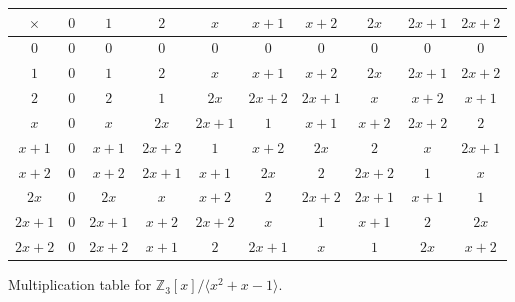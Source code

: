 \begin{solution}
    \begin{figure}[H]
      \centering
      \begin{tabular}{c|ccccccccc}
        $\times$ & $0$ & $1$ & $2$ & $x$ & $x+1$ & $x+2$ & $2x$ & $2x+1$ & $2x+2$ \\
        \hline
        $0$ & $0$ & $0$ & $0$ & $0$ & $0$ & $0$ & $0$ & $0$ & $0$ \\
        $1$ & $0$ & $1$ & $2$ & $x$ & $x+1$ & $x+2$ & $2x$ & $2x+1$ & $2x+2$ \\
        $2$ & $0$ & $2$ & $1$ & $2x$ & $2x+2$ & $2x+1$ & $x$ & $x+2$ & $x+1$ \\
        $x$ & $0$ & $x$ & $2x$ & $2x + 1$ & $1$ & $x+1$ & $x+2$ & $2x+2$ & $2$ \\
        $x+1$ & $0$ & $x+1$ & $2x+2$ & $1$ & $x+2$ & $2x$ & $2$ & $x$ & $2x+1$ \\
        $x+2$ & $0$ & $x+2$ & $2x+1$ & $x+1$ & $2x$ & $2$ & $2x+2$ & $1$ & $x$ \\
        $2x$ & $0$ & $2x$ & $x$ & $x+2$ & $2$ & $2x+2$ & $2x+1$ & $x+1$ & $1$ \\
        $2x+1$ & $0$ & $2x+1$ & $x+2$ & $2x+2$ & $x$ & $1$ & $x+1$ & $2$ & $2x$ \\
        $2x+2$ & $0$ & $2x+2$ & $x+1$ & $2$ & $2x+1$ & $x$ & $1$ & $2x$ & $x+2$ \\
      \end{tabular}
      \caption{Multiplication table for $\mathbb{Z}_3[x]/\langle x^2 + x - 1\rangle$.}
    \end{figure}

  \end{solution}

